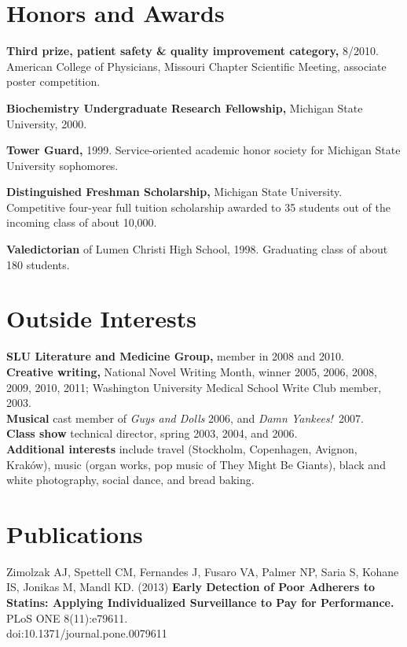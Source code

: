 \documentclass[12pt]{article}
\begin{document}
\section*{Honors and Awards}

\textbf{Third prize, patient safety \& quality improvement category,} 8/2010.
American College of Physicians, Missouri Chapter Scientific Meeting,
associate poster competition.

\textbf{Biochemistry Undergraduate Research Fellowship,} Michigan State
University, 2000.

\textbf{Tower Guard,} 1999. Service-oriented academic honor
society for Michigan State University sophomores.

\textbf{Distinguished Freshman Scholarship,} Michigan State
University. Competitive four-year full tuition scholarship awarded to
35 students out of the incoming class of about 10,000.

\textbf{Valedictorian} of Lumen Christi High School, 1998. Graduating
class of about 180 students.

\section*{Outside Interests}

\textbf{SLU Literature and Medicine Group,} member in 2008 and 2010.\\
\textbf{Creative writing,} National Novel Writing Month, winner 2005, 2006,
2008, 2009, 2010, 2011; Washington University Medical School Write Club
member, 2003.\\
\textbf{Musical} cast member of \emph{Guys and Dolls} 2006, and
\emph{Damn Yankees!}\ 2007.\\
\textbf{Class show} technical director, spring 2003, 2004, and 2006.\\
\textbf{Additional interests} include travel (Stockholm, Copenhagen, Avignon,
Krak\'ow), music (organ works, pop music of They Might Be Giants), black
and white photography, social dance, and bread baking.

\section*{Publications}
Zimolzak AJ, Spettell CM, Fernandes J, Fusaro VA, Palmer NP, Saria S,
Kohane IS, Jonikas M, Mandl KD. (2013) \textbf{Early Detection of Poor
  Adherers to Statins: Applying Individualized Surveillance to Pay for
  Performance.} PLoS ONE 8(11):e79611. \\
doi:10.1371/journal.pone.0079611
\end{document}
